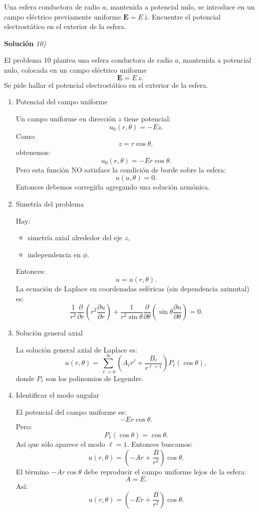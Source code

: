 \documentclass[11pt,spanish]{article}
\newcounter{problema}
\newcommand{\prob}{\stepcounter{problema} \vspace{.5cm} \noindent{\bf Problema \arabic{problema}: }}
\begin{document}
\prob Una esfera conductora de radio \(a\), mantenida a potencial nulo, se introduce en un campo eléctrico previamente uniforme \(\mathbf{E}=E\,\hat{z}\). Encuentre el potencial electrostático en el exterior de la esfera.

\vspace{0.5cm}
{\bf Soluci\'on }{\em 10)}
\vspace{0.5cm}

El problema 10 plantea una esfera conductora de radio $a$, mantenida a potencial nulo, colocada en un campo eléctrico uniforme
$$
\mathbf E = E\,\hat z.
$$
Se pide hallar el potencial electrostático en el exterior de la esfera.

\begin{enumerate}
\item Potencial del campo uniforme

Un campo uniforme en dirección $z$ tiene potencial:
$$
u_0(r,\theta)=-Ez.
$$
Como:
$$
z=r\cos\theta,
$$
obtenemos:
$$
u_0(r,\theta)=-Er\cos\theta.
$$
Pero esta función NO satisface la condición de borde sobre la esfera:
$$
u(a,\theta)=0.
$$
Entonces debemos corregirla agregando una solución armónica.

\item Simetría del problema

Hay:
\begin{itemize}
\item simetría axial alrededor del eje $z$,
\item independencia en $\phi$.
\end{itemize}
Entonces:
$$
u=u(r,\theta).
$$
La ecuación de Laplace en coordenadas esféricas (sin dependencia azimutal) es:
$$
\frac1{r^2}\frac{\partial}{\partial r}
\left(
r^2\frac{\partial u}{\partial r}
\right)
+
\frac1{r^2\sin\theta}
\frac{\partial}{\partial\theta}
\left(
\sin\theta\frac{\partial u}{\partial\theta}
\right)
=0.
$$

\item Solución general axial

La solución general axial de Laplace es:
$$
u(r,\theta)=
\sum_{\ell=0}^\infty
\left(
A_\ell r^\ell
+
\frac{B_\ell}{r^{\ell+1}}
\right)
P_\ell(\cos\theta),
$$
donde $P_\ell$ son los polinomios de Legendre.


\item Identificar el modo angular

El potencial del campo uniforme es:
$$
-Er\cos\theta.
$$
Pero:
$$
P_1(\cos\theta)=\cos\theta.
$$
Así que sólo aparece el modo $\ell=1$.
Entonces buscamos:
$$
u(r,\theta)=
\left(
-Ar+\frac{B}{r^2}
\right)\cos\theta.
$$
El término $-Ar\cos\theta$ debe reproducir el campo uniforme lejos de la esfera:
$$
A=E.
$$
Así:
$$
u(r,\theta)=
\left(
-Er+\frac{B}{r^2}
\right)\cos\theta.
$$


\end{enumerate}
\end{document}
